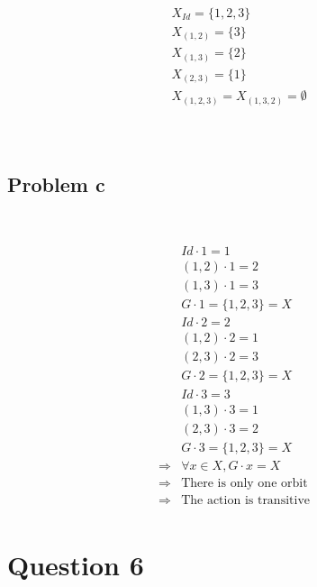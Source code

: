 \documentclass{article}
\begin{document}
~

\begin{equation*}
    \begin{split}
        &X_{Id}=\{1,2,3\}\\
        &X_{(1,2)}=\{3\}\\
        &X_{(1,3)}=\{2\}\\
        &X_{(2,3)}=\{1\}\\
        &X_{(1,2,3)}=X_{(1,3,2)}=\emptyset\\
    \end{split}
\end{equation*}

~

\subsection*{Problem c}

~

\begin{equation*}
    \begin{split}
        &Id\cdot 1=1\\
        &(1,2)\cdot 1=2\\
        &(1,3)\cdot 1=3\\
        &G\cdot 1=\{1,2,3\}=X\\
        &Id\cdot 2=2\\
        &(1,2)\cdot 2=1\\
        &(2,3)\cdot 2=3\\
        &G\cdot 2=\{1,2,3\}=X\\
        &Id\cdot 3=3\\
        &(1,3)\cdot 3=1\\
        &(2,3)\cdot 3=2\\
        &G\cdot 3=\{1,2,3\}=X\\
        \Rightarrow&\forall x\in X,G\cdot x=X\\
        \Rightarrow&\text{There is only one orbit}\\
        \Rightarrow&\text{The action is transitive}\\
    \end{split}
\end{equation*}

\newpage

\section*{Question 6}

~
\end{document}
